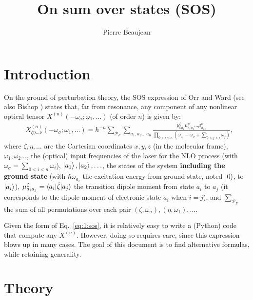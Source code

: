 \documentclass[12pt,a4paper]{article}
\title{On sum over states (SOS)}
\author{Pierre Beaujean}
\begin{document}
\maketitle

\allowdisplaybreaks
\onehalfspacing

\section{Introduction}

On the ground of perturbation theory, 
the SOS expression of Orr and Ward \cite{orrPerturbationTheoryNonlinear1971} (see also Bishop \cite{bishopExplicitNondivergentFormulas1994}) states that, far from resonance, any component of any nonlinear optical tensor $X^{(n)}(-\omega_\sigma;\omega_1,\ldots)$ (of order $n$) is given by:\begin{align}
&X^{(n)}_{\zeta\eta\ldots\nu}(-\omega_\sigma;\omega_1,\ldots) = \hbar^{-n}\sum_{\mathcal{P}_F}\sum_{a_1,a_2\ldots\,a_{n}} \frac{\mu^\zeta_{0a_1}{\mu}^\eta_{a_1a_2}\ldots \mu^\nu_{a_{n\,0}}}{\prod_{0<i\leq n} (\omega_{a_i}-\omega_\sigma+\sum_{0<j<i} \omega_j)},\label{eq:1:sos}
\end{align}
where $\zeta,\eta,\ldots$ are the Cartesian coordinates $x, y, z$ (in the molecular frame), $\omega_1, \omega_2\ldots$, the (optical) input frequencies of the laser for the NLO process (with $\omega_\sigma = \sum_{0<i<n} \omega_i$), $\ket{a_1}, \ket{a_2}, \ldots$, the states of the system  \textbf{including the ground state} (with $\hbar\omega_{a_i}$ the excitation energy from ground state, noted  $\ket{0}$, to $\ket{a_i}$), $\mu^\zeta_{a_ia_j} = \braket{a_i|\hat \zeta|a_j}$ the transition dipole moment from state $a_i$ to $a_j$ (it corresponds to the dipole moment of electronic state $a_i$ when $i=j$), and $\sum_{\mathcal{P}_F}$ the sum of all permutations over each pair $(\zeta, \omega_\sigma),(\eta,\omega_1),\ldots$. 

Given the form of Eq.~\eqref{eq:1:sos}, it is relatively easy to write a (Python) code that compute any $X^{(n)}$. However, doing so requires care, since this expression blows up in many cases. The goal of this document is to find alternative formulas, while retaining generality.

\section{Theory}
\end{document}
